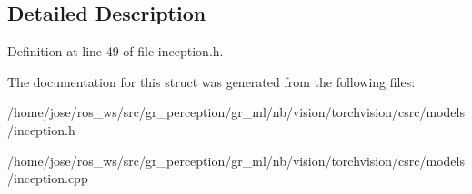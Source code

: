 \subsection{Detailed Description}


Definition at line 49 of file inception.\+h.



The documentation for this struct was generated from the following files\+:\begin{DoxyCompactItemize}
\item 
/home/jose/ros\+\_\+ws/src/gr\+\_\+perception/gr\+\_\+ml/nb/vision/torchvision/csrc/models/inception.\+h\item 
/home/jose/ros\+\_\+ws/src/gr\+\_\+perception/gr\+\_\+ml/nb/vision/torchvision/csrc/models/inception.\+cpp\end{DoxyCompactItemize}
